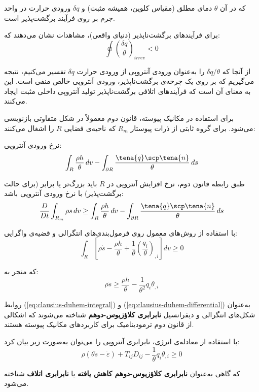که در آن $\theta$ دمای مطلق (مقیاس کلوین، همیشه مثبت) و $\delta q$ ورودی حرارت در واحد جرم بر روی فرآیند برگشت‌پذیر است.

برای فرآیندهای برگشت‌ناپذیر (دنیای واقعی)، مشاهدات نشان می‌دهند که:
\begin{equation}
	\oint \left( \frac{\delta q}{\theta} \right)_{irrev} < 0
\end{equation}

از آنجا که $\delta q / \theta$ را به‌عنوان ورودی آنتروپی از ورودی حرارت $\delta q$ تفسیر می‌کنیم، نتیجه می‌گیریم که بر روی یک چرخه‌ی برگشت‌ناپذیر، ورودی آنتروپی خالص منفی است. این به معنای آن است که فرآیندهای اتلافی برگشت‌ناپذیر تولید آنتروپی داخلی مثبت ایجاد می‌کنند.

برای استفاده در مکانیک پیوسته، قانون دوم معمولاً در شکل متفاوتی بازنویسی می‌شود. برای گروه ثابتی از ذرات پیوستار $R_m$ که ناحیه‌ی فضایی $R$ را اشغال می‌کنند:

نرخ ورودی آنتروپی:
\begin{equation}
	\int_R \frac{\rho h}{\theta} \, dv - \int_{\partial R} \frac{\tena{q} \scp \tena{n}}{\theta} \, ds
\end{equation}

طبق رابطه قانون دوم، نرخ افزایش آنتروپی در $R$ باید بزرگ‌تر یا برابر (برای حالت برگشت‌پذیر) با نرخ ورودی آنتروپی باشد:
\begin{equation}
	\frac{D}{Dt} \int_{R_m} \rho s \, dv \geq \int_R \frac{\rho h}{\theta} \, dv - \int_{\partial R} \frac{\tena{q} \scp \tena{n}}{\theta} \, ds
\end{equation}

با استفاده از روش‌های معمول روی فرمول‌بندی‌های انتگرالی و قضیه‌ی واگرایی:
\begin{equation}
	\int_R \left[ \rho \dot{s} - \frac{\rho h}{\theta} + \frac{1}{\theta} \left( \frac{q_i}{\theta} \right)_{,i} \right] dv \geq 0
\end{equation}

که منجر به:
\begin{equation}
	\rho \dot{s} \geq \frac{\rho h}{\theta} - \frac{1}{\theta^2} q_i \theta_{,i}
\end{equation}

روابط (\ref{eq:clausius-duhem-integral}) و (\ref{eq:clausius-duhem-differential}) به‌عنوان شکل‌های انتگرالی و دیفرانسیل \textbf{نابرابری کلاؤزیوس-دوهم} شناخته می‌شوند که اشکالی از قانون دوم ترمودینامیک برای کاربردهای مکانیک پیوسته هستند.

با استفاده از معادله‌ی انرژی، نابرابری آنتروپی را می‌توان به‌صورت زیر بیان کرد:
\begin{equation}
	\rho(\theta \dot{s} - \dot{\varepsilon}) + T_{ij} D_{ij} - \frac{1}{\theta} q_i \theta_{,i} \geq 0
\end{equation}

که گاهی به‌عنوان \textbf{نابرابری کلاؤزیوس-دوهم کاهش یافته} یا \textbf{نابرابری اتلاف} شناخته می‌شود.
